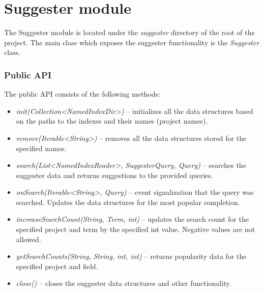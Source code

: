 \section{Suggester module}
The Suggester module is located under the \textit{suggester} directory of the root of the project. The main class which
exposes the suggester functionality is the \textit{Suggester} class.

\subsubsection{Public API}
\label{public_api}
The public API consists of the following methods:
\begin{itemize}
    \item \textit{init(Collection\textless NamedIndexDir\textgreater)} – initializes all the data structures based on the paths
    to the indexes and their names (project names).
    \item \textit{remove(Iterable\textless String\textgreater)} – removes all the data structures stored for the
    specified names.
    \item \textit{search(List\textless NamedIndexReader\textgreater, SuggesterQuery, Query)} –
    searches the suggester data and returns suggestions to the provided queries.
    \item \textit{onSearch(Iterable\textless String\textgreater, Query)} –
    event signalization that the query was searched. Updates the data structures for the most popular completion.
    \item \textit{increaseSearchCount(String, Term, int)} – updates the search count for the specified project and term by the
    specified int value. Negative values are not allowed.
    \item \textit{getSearchCounts(String, String, int, int)} – returns popularity data for the specified project and field.
    \item \textit{close()} – closes the suggester data structures and other functionality.
\end{itemize}

